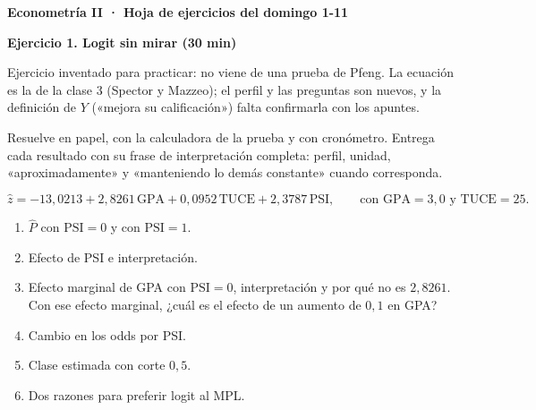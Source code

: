 \documentclass[12pt]{article}
\begin{document}
{\large\textbf{Econometría II · Hoja de ejercicios del domingo 1-11}}

\textbf{Ejercicio 1. Logit sin mirar (30 min)}

{\small Ejercicio inventado para practicar: no viene de una prueba de Pfeng. La ecuación es la de la clase 3 (Spector y Mazzeo); el perfil y las preguntas son nuevos, y la definición de $Y$ («mejora su calificación») falta confirmarla con los apuntes.}

Resuelve en papel, con la calculadora de la prueba y con cronómetro. Entrega cada resultado con su frase de interpretación completa: perfil, unidad, «aproximadamente» y «manteniendo lo demás constante» cuando corresponda.

\[
\hat{z} = -13{,}0213 + 2{,}8261\,\text{GPA} + 0{,}0952\,\text{TUCE} + 2{,}3787\,\text{PSI},
\qquad \text{con } \text{GPA}=3{,}0 \text{ y } \text{TUCE}=25.
\]

\begin{enumerate}[label=\alph*), itemsep=4pt]
  \item $\hat{P}$ con $\text{PSI}=0$ y con $\text{PSI}=1$.
  \item Efecto de PSI e interpretación.
  \item Efecto marginal de GPA con $\text{PSI}=0$, interpretación y por qué no es $2{,}8261$. Con ese efecto marginal, ¿cuál es el efecto de un aumento de $0{,}1$ en GPA?
  \item Cambio en los odds por PSI.
  \item Clase estimada con corte $0{,}5$.
  \item Dos razones para preferir logit al MPL.
\end{enumerate}
\end{document}
